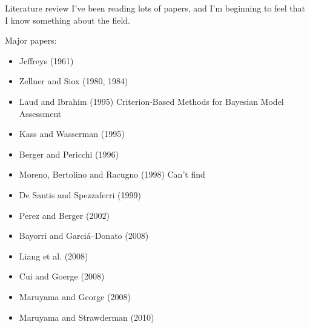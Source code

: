 \documentclass{beamer}
\begin{document}
\begin{frame}{Literature review}
	I've been reading lots of papers, and I'm beginning to feel that I know something about the field.
	
	Major papers:
	
	\begin{itemize}
		\item Jeffreys (1961)
		\item Zellner and Siox (1980, 1984)
		\item Laud and Ibrahim (1995) Criterion-Based Methods for Bayesian Model Assessment
		\item Kass and Wasserman (1995)
		\item Berger and Pericchi (1996)
		\item Moreno, Bertolino and Racugno (1998) Can't find
		\item De Santis and Spezzaferri (1999)
		\item Perez and Berger (2002)
		\item Bayorri and Garci\'{a}--Donato (2008)
		\item Liang et al. (2008)
		\item Cui and Goerge (2008)
		\item Maruyama and George (2008)
		\item Maruyama and Strawderman (2010)
	\end{itemize}
\end{frame}
\end{document}
